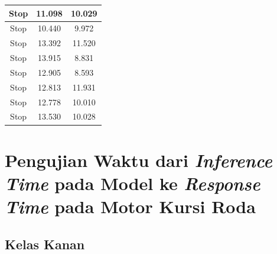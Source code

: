 \begin{longtable}{|c|c|c|}
  Stop           & 11.098              & 10.029           \\ \hline
  Stop           & 10.440              & 9.972            \\ \hline
  Stop           & 13.392              & 11.520           \\ \hline
  Stop           & 13.915              & 8.831            \\ \hline
  Stop           & 12.905              & 8.593            \\ \hline
  Stop           & 12.813              & 11.931           \\ \hline
  Stop           & 12.778              & 10.010           \\ \hline
  Stop           & 13.530              & 10.028           \\ \hline
\end{longtable}

\section{Pengujian Waktu dari \emph{Inference Time} pada Model ke \emph{Response Time} pada Motor Kursi Roda}

\subsection{Kelas Kanan}

